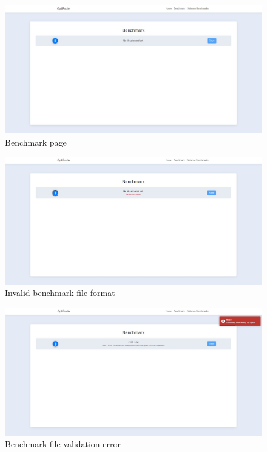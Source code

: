 \documentclass[a4paper,twoside,12pt]{book}
\begin{document}
\begin{figure}[H]
\centering
\includegraphics[scale=0.3]{images/benchmark.jpg}
\caption{Benchmark page}
\label{fig:benchmark}
\end{figure}

\begin{figure}[H]
\centering
\includegraphics[scale=0.3]{images/benchmarkInvalidFormat.jpg}
\caption{Invalid benchmark file format}
\label{fig:benchmarkInvalidFormat}
\end{figure}

\begin{figure}[H]
\centering
\includegraphics[scale=0.3]{images/benchmarkInvalidFile.jpg}
\caption{Benchmark file validation error}
\label{fig:benchmarkInvalidFile}
\end{figure}
\end{document}
